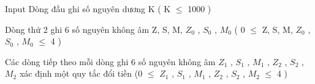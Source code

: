 Input
Dòng đầu ghi số nguyên dương K ( K  $\le$  1000 )

Dòng thứ 2 ghi 6 số nguyên không âm Z, S, M, $Z_{0}$ , $S_{0}$ , $M_{0}$ ( 0  $\le$  Z, S, M, $Z_{0}$ , $S_{0}$ , $M_{0}$  $\le$  4 )

Các dòng tiếp theo mỗi dòng ghi 6 số nguyên không âm $Z_{1}$ , $S_{1}$ , $M_{1}$ , $Z_{2}$ , $S_{2}$ , $M_{2}$ xác định một quy tắc đổi tiền (0  $\le$  $Z_{1}$ , $S_{1}$ , $M_{1}$ , $Z_{2}$ , $S_{2}$ , $M_{2}$  $\le$  4 )